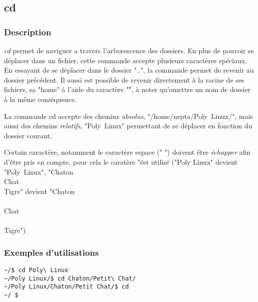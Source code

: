 \subsection{cd}
\subsubsection{Description}
\emph{cd} permet de naviguer a travers l'arborescence des dossiers.
En plus de pouvoir se déplacer dans un fichier, cette commande accepte plusieurs caractères spéciaux.
En essayant de se déplacer dans le dossier "..", la commande permet de revenir au dossier précédent.
Il aussi est possible de revenir directement à la racine de ses fichiers, sa "home" à l'aide du caractère "\~", à noter qu'omettre un nom de dossier à la même conséquence.

La commande cd accepte des chemins \emph{absolus}, "/home/nepta/Poly\ Linux/", mais aussi des chemins \emph{relatifs}, "Poly\ Linux" permettant de se déplacer en fonction du dossier courant.

Certain caractère, notamment le caractère espace (" ") doivent être \emph{échapper} afin d'être pris en compte, pour cela le caratère "\" est utilisé ("Poly Linux" devient "Poly\ Linux",
"Chaton\\Chat\\Tigre" devient "Chaton\\\\Chat\\\\Tigre")

\subsubsection{Exemples d'utilisations}

\begin{lstlisting}
~/$ cd Poly\ Linux
~/Poly Linux/$ cd Chaton/Petit\ Chat/
~/Poly Linux/Chaton/Petit Chat/$ cd
~/ $ 
\end{lstlisting}
